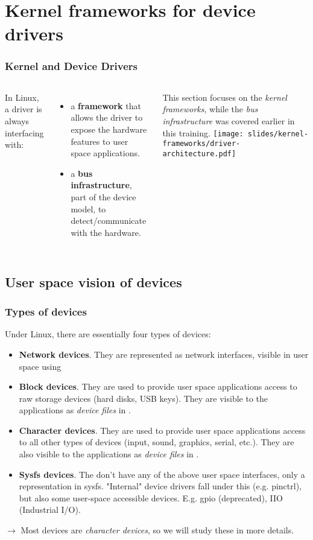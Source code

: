 \section{Kernel frameworks for device drivers}

\begin{frame}
  \frametitle{Kernel and Device Drivers}
  \begin{columns}
     In Linux, a driver is always interfacing
    with:
    \begin{itemize}
    \item a {\bf framework} that allows the driver to expose the
      hardware features to user space applications.
    \item a {\bf bus infrastructure}, part of the device model, to
      detect/communicate with the hardware.
    \end{itemize}
    This section focuses on the {\em kernel frameworks}, while the
    {\em bus infrastructure} was covered earlier in this training.
    \texttt{[image: slides/kernel-frameworks/driver-architecture.pdf]}
  \end{columns}
\end{frame}

\subsection{User space vision of devices}

\begin{frame}
  \frametitle{Types of devices} Under Linux, there are essentially
  four types of devices:
  \begin{itemize}
  \item {\bf Network devices}. They are represented as network
    interfaces, visible in user space using 
  \item {\bf Block devices}. They are used to provide user space
    applications access to raw storage devices (hard disks, USB
    keys). They are visible to the applications as {\em device files}
    in .
  \item {\bf Character devices}. They are used to provide user space
    applications access to all other types of devices (input, sound,
    graphics, serial, etc.). They are also visible to the applications
    as {\em device files} in .
  \item {\bf Sysfs devices}. The don't have any of the above user space
    interfaces, only a representation in sysfs. "Internal" device drivers
    fall under this (e.g. pinctrl), but also some user-space accessible
    devices. E.g. gpio (deprecated), IIO (Industrial I/O).
  \end{itemize}
  $\rightarrow$ Most devices are {\em character devices}, so we will
  study these in more details.
\end{frame}

